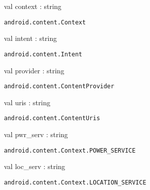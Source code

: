 \documentclass[11pt]{article}
\begin{document}
\begin{ocamldocsigend}


\label{val:Android.Content.context}\begin{ocamldoccode}
val context : string
\end{ocamldoccode}
\begin{ocamldocdescription}
{\tt{android.content.Context}}


\end{ocamldocdescription}


\label{val:Android.Content.intent}\begin{ocamldoccode}
val intent : string
\end{ocamldoccode}
\begin{ocamldocdescription}
{\tt{android.content.Intent}}


\end{ocamldocdescription}


\label{val:Android.Content.provider}\begin{ocamldoccode}
val provider : string
\end{ocamldoccode}
\begin{ocamldocdescription}
{\tt{android.content.ContentProvider}}


\end{ocamldocdescription}


\label{val:Android.Content.uris}\begin{ocamldoccode}
val uris : string
\end{ocamldoccode}
\begin{ocamldocdescription}
{\tt{android.content.ContentUris}}


\end{ocamldocdescription}


\label{val:Android.Content.pwr-underscoreserv}\begin{ocamldoccode}
val pwr_serv : string
\end{ocamldoccode}
\begin{ocamldocdescription}
{\tt{android.content.Context.POWER\_SERVICE}}


\end{ocamldocdescription}


\label{val:Android.Content.loc-underscoreserv}\begin{ocamldoccode}
val loc_serv : string
\end{ocamldoccode}
\begin{ocamldocdescription}
{\tt{android.content.Context.LOCATION\_SERVICE}}



\end{ocamldocdescription}
\end{ocamldocsigend}
\end{document}

